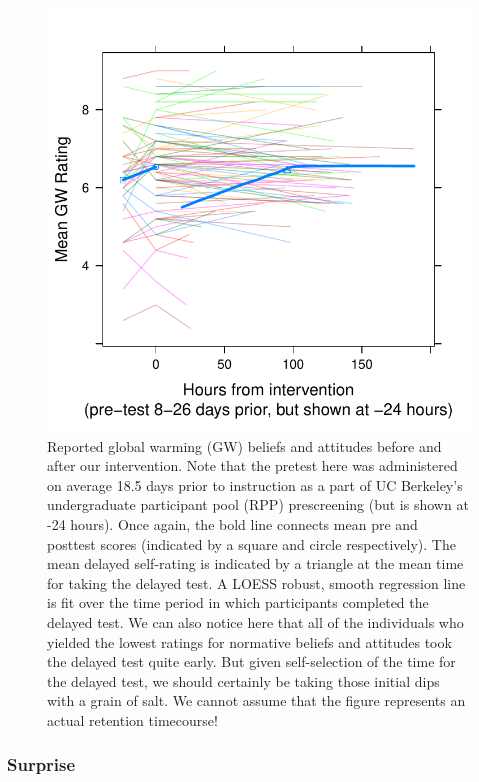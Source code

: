 \begin{figure}
    \centering
    \includegraphics{RPP-mech-GW.pdf}
    \caption{Reported global warming (GW) beliefs and attitudes before and after
        our intervention. Note that the pretest here was administered on average
        18.5 days prior to instruction as a part of UC Berkeley's undergraduate
        participant pool (RPP) prescreening (but is shown at -24 hours). Once
        again, the bold line connects mean pre and posttest scores (indicated by
        a square and circle respectively). The mean delayed self-rating is
        indicated by a triangle at the mean time for taking the delayed test. A
        LOESS robust, smooth regression line is fit over the time period in
        which participants completed the delayed test.  We can also notice here that all
        of the individuals who yielded the lowest ratings for normative beliefs
        and attitudes took the delayed test quite early. But given
        self-selection of the time for the delayed test, we should certainly be
        taking those initial dips with a grain of salt. We cannot assume that
        the figure represents an actual retention timecourse!}
    \label{fig:RPP-mech-GW}
\end{figure}


\subsubsection{Surprise}

